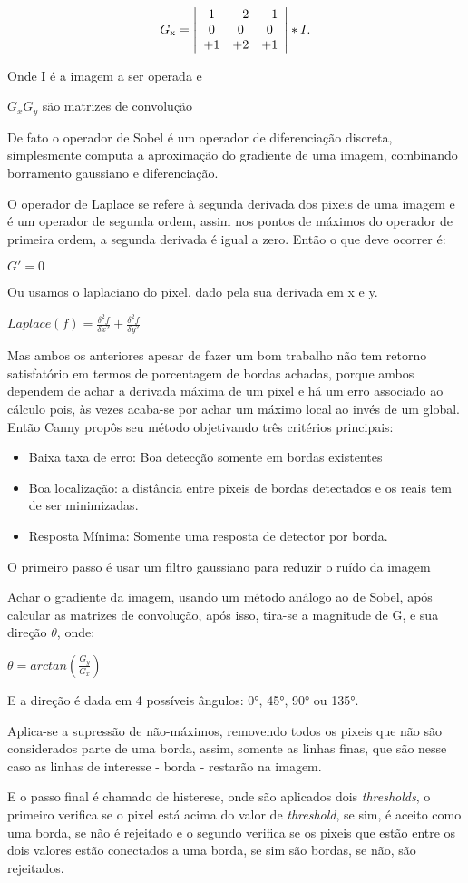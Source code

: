 \documentclass[conference,harvard,brazil,english]{sbatex}
\begin{document}
			\[ G\textsubscript{x} = \left| \begin{array}{ccc}
			\-1 & -2 & -1 \\
			0 & 0  & 0 \\
			+1 & +2 & +1 \end{array}\right| * I.\] 
		\par\centerline{Onde I é a imagem a ser operada e } 
		\centerline{$G_x G_y$ são matrizes de convolução}
		\par De fato o operador de Sobel é um operador de diferenciação discreta, simplesmente computa a aproximação do gradiente de uma imagem, combinando borramento gaussiano e diferenciação.
		\par O operador de Laplace se refere à segunda derivada dos pixeis de uma imagem e é um operador de segunda ordem, assim nos pontos de máximos do operador de primeira ordem, a segunda derivada é igual a zero. Então o que deve ocorrer é:\newline
		\centerline{$G' = 0$}
		\par Ou usamos o laplaciano do pixel, dado pela sua derivada em x e y.\newline
		\centerline{$Laplace(f) = \frac{\delta^2f}{\delta x^2} + \frac{\delta^2f}{\delta y^2}$}
		\par Mas ambos os anteriores apesar de fazer um bom trabalho não tem retorno satisfatório em termos de porcentagem de bordas achadas, porque ambos dependem de achar a derivada máxima de um pixel e há um erro associado ao cálculo pois, às vezes acaba-se por achar um máximo local ao invés de um global. Então Canny propôs seu método objetivando três critérios principais:
		\begin{itemize}
			\item Baixa taxa de erro: Boa detecção somente em bordas existentes
			\item Boa localização: a distância entre pixeis de bordas detectados e os reais tem de ser minimizadas.
			\item Resposta Mínima: Somente uma resposta de detector por borda.
		\end{itemize}
		\par O primeiro passo é usar um filtro gaussiano para reduzir o ruído da imagem
		\par Achar o gradiente da imagem, usando um método análogo ao de Sobel, após calcular as matrizes de convolução, após isso, tira-se a magnitude de G, e sua direção $\theta$, onde:
		\centerline{$\theta = arctan(\frac{G_y}{G_x})$}
		\par E a direção é dada em 4 possíveis ângulos: 0°, 45°, 90° ou 135°.
		\par Aplica-se a supressão de não-máximos, removendo todos os pixeis que não são considerados parte de uma borda, assim, somente as linhas finas, que são nesse caso as linhas de interesse - borda - restarão na imagem.
		\par E o passo final é chamado de histerese, onde são aplicados dois \textit{thresholds}, o primeiro verifica se o pixel está acima do valor de \textit{threshold}, se sim, é aceito como uma borda, se não é rejeitado e o segundo verifica se os pixeis que estão entre os dois valores estão conectados a uma borda, se sim são bordas, se não, são rejeitados.
\end{document}
